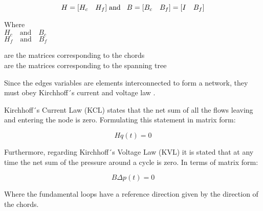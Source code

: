 \begin{equation}
H = [H_c \quad H_f]
\hspace{0.1cm} \text{and}\hspace{0.3cm}
B = [B_c  \quad B_f] = [I \quad B_f]
\label{HandB}
\end{equation}

\begin{minipage}[t]{0.20\textwidth}
Where\\
\hspace*{8mm} $H_c \quad \text{and} \quad B_c$ \\
\hspace*{8mm} $H_f \quad \text{and} \quad B_f$ 
\end{minipage}
\begin{minipage}[t]{0.68\textwidth}
\vspace*{2mm}
\hspace*{8mm} are the matrices corresponding to the chords\\
\hspace*{8mm} are the matrices corresponding to the spanning tree 
\end{minipage}

Since the edges variables are elements interconnected to form a network, 
they must obey Kirchhoff´s current and voltage law \cite{GraphModel}. 

Kirchhoff´s Current Law (KCL) states that the net sum of all the flows leaving and entering the node is zero. Formulating this statement in matrix form:

\begin{equation}
  \label{KCL}
  Hq(t) = 0
\end{equation}

Furthermore, regarding Kirchhoff´s Voltage Law (KVL) it is stated that at any time the net sum of the pressure around a cycle 
is zero. In terms of matrix form:

\begin{equation}
 \label{KVL} 
 B\Delta p (t) = 0
\end{equation}

Where the fundamental loops have a reference direction given by the direction of the 
chords. 





 